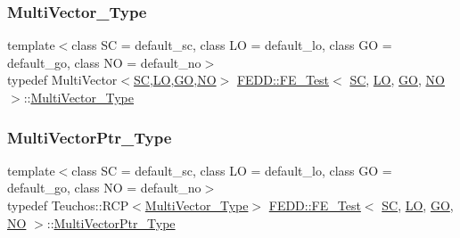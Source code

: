 \mbox{\label{classFEDD_1_1FE__Test_a431ec5a97628feb8a0a8d16874ecd060}} 
\subsubsection{\texorpdfstring{Multi\+Vector\+\_\+\+Type}{MultiVector\_Type}}
{\footnotesize\ttfamily template$<$class SC  = default\+\_\+sc, class LO  = default\+\_\+lo, class GO  = default\+\_\+go, class NO  = default\+\_\+no$>$ \\
typedef Multi\+Vector$<$\hyperlink{fe__test__laplace_8cpp_a79c7e86a57edbb2a5a53242bcd04e41e}{SC},\hyperlink{fe__test__laplace_8cpp_ad6a38c9f07d3fd633eefca5bccad8410}{LO},\hyperlink{fe__test__laplace_8cpp_afa2946b509009b4f45eb04bd8c5b27d9}{GO},\hyperlink{fe__test__laplace_8cpp_a5e24f37b28787429872b6ecb1d0417ce}{NO}$>$ \hyperlink{classFEDD_1_1FE__Test}{F\+E\+D\+D\+::\+F\+E\+\_\+\+Test}$<$ \hyperlink{fe__test__laplace_8cpp_a79c7e86a57edbb2a5a53242bcd04e41e}{SC}, \hyperlink{fe__test__laplace_8cpp_ad6a38c9f07d3fd633eefca5bccad8410}{LO}, \hyperlink{fe__test__laplace_8cpp_afa2946b509009b4f45eb04bd8c5b27d9}{GO}, \hyperlink{fe__test__laplace_8cpp_a5e24f37b28787429872b6ecb1d0417ce}{NO} $>$\+::\hyperlink{classFEDD_1_1FE__Test_a431ec5a97628feb8a0a8d16874ecd060}{Multi\+Vector\+\_\+\+Type}}

\mbox{\label{classFEDD_1_1FE__Test_ac7c0363aa74e0bfcb903c13330c50185}} 
\subsubsection{\texorpdfstring{Multi\+Vector\+Ptr\+\_\+\+Type}{MultiVectorPtr\_Type}}
{\footnotesize\ttfamily template$<$class SC  = default\+\_\+sc, class LO  = default\+\_\+lo, class GO  = default\+\_\+go, class NO  = default\+\_\+no$>$ \\
typedef Teuchos\+::\+R\+CP$<$\hyperlink{classFEDD_1_1FE__Test_a431ec5a97628feb8a0a8d16874ecd060}{Multi\+Vector\+\_\+\+Type}$>$ \hyperlink{classFEDD_1_1FE__Test}{F\+E\+D\+D\+::\+F\+E\+\_\+\+Test}$<$ \hyperlink{fe__test__laplace_8cpp_a79c7e86a57edbb2a5a53242bcd04e41e}{SC}, \hyperlink{fe__test__laplace_8cpp_ad6a38c9f07d3fd633eefca5bccad8410}{LO}, \hyperlink{fe__test__laplace_8cpp_afa2946b509009b4f45eb04bd8c5b27d9}{GO}, \hyperlink{fe__test__laplace_8cpp_a5e24f37b28787429872b6ecb1d0417ce}{NO} $>$\+::\hyperlink{classFEDD_1_1FE__Test_ac7c0363aa74e0bfcb903c13330c50185}{Multi\+Vector\+Ptr\+\_\+\+Type}}

